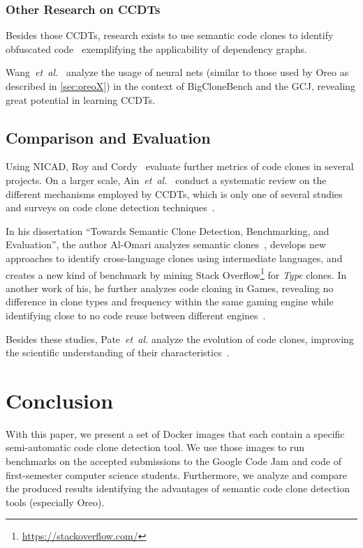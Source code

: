 \documentclass[10pt,journal,compsoc]{IEEEtran}
\def\T#1{\textsl{Type\nobreakdash-#1}}
\newcommand*\urldate[2]{\url{#1}\;\textsuperscript{\color{gray}\DTMdate{#2}}}
\newcommand*\footurl[3][]{\footnote{#1\urldate{#2}{#3}}}
\begin{document}
\subsubsection{Other Research on CCDTs}
Besides those CCDTs, research exists to use semantic code clones to identify obfuscated code~\cite{SHENEAMER2018405} exemplifying the applicability of dependency graphs.

Wang~\textsl{et~al.}~\cite{wang2020detecting} analyze the usage of neural nets (similar to those used by Oreo as described in \cref{sec:oreoX}) in the context of BigCloneBench and the GCJ, revealing great potential in learning CCDTs.

\subsection{Comparison and Evaluation}

Using NICAD, Roy and Cordy~\cite{roy2008empirical} evaluate further metrics of code clones in several projects.
On a larger scale, Ain~\textsl{et~al.}~\cite{ain2019systematic} conduct a systematic review on the different mechanisms employed by CCDTs, which is only one of several studies and surveys on code clone detection techniques~\cite{gautam2016various,rattan2013software,shobha2021code,lei2022deep,8668015}.

In his dissertation \enquote{Towards Semantic Clone Detection, Benchmarking, and Evaluation}, the author Al-Omari analyzes semantic clones~\cite{al2021towards}, develops new approaches to identify cross-language clones using intermediate languages, and creates a new kind of benchmark by mining Stack Overflow\footurl{https://stackoverflow.com/}{2022-03-02} for \T4 clones.
In another work of his, he further analyzes code cloning in Games, revealing no difference in clone types and frequency within the same gaming engine while identifying close to no code reuse between different engines~\cite{al2016code}.

Besides these studies, Pate~\textsl{et~al.} analyze the evolution of code clones, improving the scientific understanding of their characteristics~\cite{pate2013clone}.

\section{Conclusion}\label{sec:conclusion}
With this paper, we present a set of Docker images that each contain a specific semi-automatic code clone detection tool.
We use those images to run benchmarks on the accepted submissions to the Google Code Jam and code of first-semester computer science students.
Furthermore, we analyze and compare the produced results identifying the advantages of semantic code clone detection tools (especially Oreo).
\end{document}
